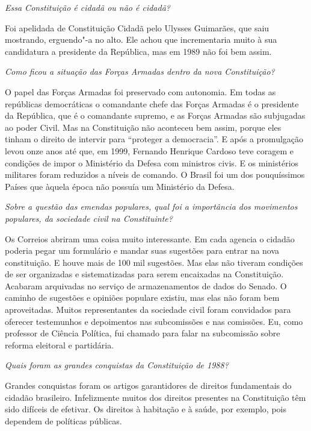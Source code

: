 \medskip

\noindent\emph{Essa Constituição é cidadã ou não é cidadã?}

Foi apelidada de Constituição Cidadã pelo Ulysses
Guimarães, que saiu mostrando, erguendo"-a no alto. Ele achou que
incrementaria muito à sua candidatura a presidente da República, mas em
1989 não foi bem assim.

\medskip

\noindent\emph{Como ficou a situação das Forças Armadas dentro da nova
Constituição?}

O papel das Forças Armadas foi preservado com
autonomia. Em todas as repúblicas democráticas o comandante chefe das
Forças Armadas é o presidente da República, que é o comandante supremo,
e as Forças Armadas são subjugadas ao poder Civil. Mas na Constituição
não aconteceu bem assim, porque eles tinham o direito de intervir para
``proteger a democracia''. E após a promulgação levou onze anos até que,
em 1999, Fernando Henrique Cardoso teve coragem e condições de impor o
Ministério da Defesa com ministros civis. E os ministérios militares
foram reduzidos a níveis de comando. O Brasil foi um dos pouquíssimos
Países que àquela época não possuía um Ministério da Defesa.

\medskip

\noindent\emph{Sobre a questão das emendas populares, qual foi a importância
dos movimentos populares, da sociedade civil na Constituinte?}

Os Correios abriram uma coisa muito interessante. Em
cada agencia o cidadão poderia pegar um formulário e mandar suas
sugestões para entrar na nova constituição. E houve mais de 100 mil
sugestões. Mas elas não tiveram condições de ser organizadas e
sistematizadas para serem encaixadas na Constituição. Acabaram
arquivadas no serviço de armazenamentos de dados do Senado. O caminho de
sugestões e opiniões populare existiu, mas elas não foram bem
aproveitadas. Muitos representantes da sociedade civil foram convidados
para oferecer testemunhos e depoimentos nas subcomissões e nas
comissões. Eu, como professor de Ciência Política, fui chamado para
falar na subcomissão sobre reforma eleitoral e partidária.

\medskip

\noindent\emph{Quais foram as grandes conquistas da Constituição de 1988?}

Grandes conquistas foram os artigos garantidores de
direitos fundamentais do cidadão brasileiro. Infelizmente muitos dos
direitos presentes na Constituição têm sido difíceis de efetivar. Os
direitos à habitação e à saúde, por exemplo, pois dependem de políticas
públicas.

